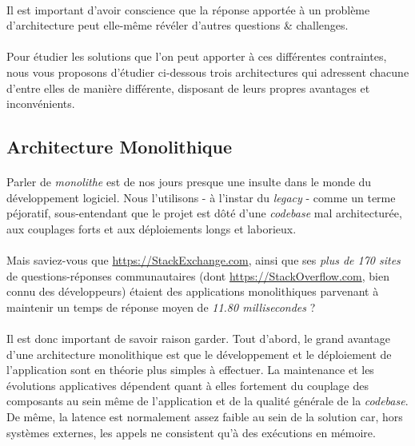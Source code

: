 \paragraph{} Il est important d'avoir conscience que la réponse apportée à un problème d'architecture peut elle-même révéler 
d'autres questions \& challenges.

\paragraph{} Pour étudier les solutions que l'on peut apporter à ces différentes contraintes, nous vous proposons d'étudier
ci-dessous trois architectures qui adressent chacune d'entre elles de manière différente, disposant de leurs propres
avantages et inconvénients.


\subsection*{Architecture Monolithique}

\paragraph{} Parler de \emph{monolithe} est de nos jours presque une insulte dans le monde du développement logiciel. Nous 
l'utilisons - à l'instar du \emph{legacy} - comme un terme péjoratif, sous-entendant que le projet est dôté d'une \emph{codebase}
mal architecturée, aux couplages forts et aux déploiements longs et laborieux.

\paragraph{} Mais saviez-vous que \url{https://StackExchange.com}, ainsi que ses \emph{plus de 170 sites} de questions-réponses
communautaires (dont \url{https://StackOverflow.com}, bien connu des développeurs) étaient des applications monolithiques 
parvenant à maintenir un temps de réponse moyen de \emph{11.80 millisecondes} \cite{Microservices7} ?

\paragraph{} Il est donc important de savoir raison garder. Tout d'abord, le grand avantage d'une architecture monolithique
est que le développement et le déploiement de l'application sont en théorie plus simples à effectuer. La maintenance et 
les évolutions applicatives dépendent quant à elles fortement du couplage des composants au sein même de l'application et 
de la qualité générale de la \emph{codebase}. De même, la latence est normalement assez faible au sein de la solution car,
hors systèmes externes, les appels ne consistent qu'à des exécutions en mémoire.

